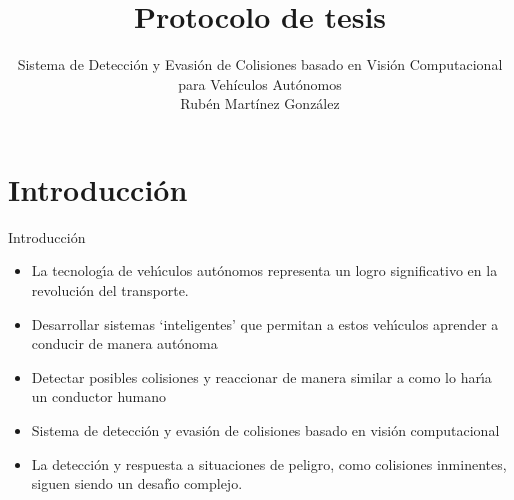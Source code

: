 \documentclass[8pt]{beamer}
\author[]
{Sistema de Detección y Evasión de Colisiones basado en Visión Computacional para Vehículos Autónomos\\
\vspace{2em}
Rubén Martínez González}
\title[Protocolo de tesis]{Protocolo de tesis}
\institute[FMAT, UADY]{Facultad de Matemáticas, UADY}
\date{}
\begin{document}
    
    \begin{frame}
        \titlepage
    \end{frame}
    
    
    
    \section{Introducción}
    \begin{frame}{Introducción}
        \begin{itemize}
            \item La tecnologı́a de vehı́culos autónomos representa un logro significativo en la revolución del transporte.
            \item Desarrollar sistemas ‘inteligentes’ que permitan a estos vehı́culos aprender a conducir de manera autónoma
            \item Detectar posibles colisiones y reaccionar de manera similar a como lo harı́a un conductor humano
            \item Sistema de detección y evasión de colisiones basado en visión computacional
            \item La detección y respuesta a situaciones de peligro, como colisiones inminentes, siguen siendo un desafı́o complejo.
        \end{itemize}
    \end{frame}
    
    
\end{document}
